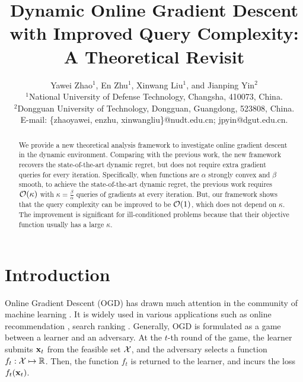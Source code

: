 \documentclass{article}
\date{}
\begin{document}
\title{Dynamic Online Gradient Descent with Improved Query Complexity: A Theoretical Revisit}

\author{Yawei Zhao$^1$, En Zhu$^1$, Xinwang Liu$^1$, and Jianping Yin$^2$ \\ 
$^1$National University of Defense Technology, Changsha, 410073, China. \\ 
$^2$Dongguan University of Technology, Dongguan, Guangdong, 523808, China. \\ 
E-mail: \{zhaoyawei, enzhu, xinwangliu\}@nudt.edu.cn; jpyin@dgut.edu.cn.
}

\maketitle



\begin{abstract}
We provide a new theoretical analysis framework to investigate online gradient descent in the dynamic environment. Comparing with the previous work, the new framework recovers the state-of-the-art dynamic regret, but does not require extra gradient queries for every iteration. Specifically, when functions are $\alpha$ strongly convex and $\beta$ smooth, to achieve the state-of-the-art dynamic regret, the previous work requires  ${\mathcal{O}}(\kappa)$ with $\kappa = \frac{\beta}{\alpha}$ queries of gradients at every iteration. But, our framework shows that the query complexity can be improved to be ${\mathcal{O}}(1)$, which does not depend on $\kappa$. The improvement is significant for ill-conditioned problems because that their objective function usually has a large $\kappa$.   

\end{abstract}








\section{Introduction}
Online Gradient Descent (OGD) has drawn much attention in the  community of machine learning \cite{Zhu:2015tr,Hazan2007Adaptive,Hall:2015ct,ShalevShwartz:2012dz,Garber:2018wf,Bedi:2018te}. It is widely used in various applications such as online recommendation \cite{Song:2008:RAT}, search ranking \cite{Moon:2010}. Generally, OGD is formulated as a game between a learner and an adversary. At the $t$-th round of the game, the learner submits ${\bf x}_t$ from the feasible set ${\mathcal{X}}$, and the adversary selects a function $f_t:{\mathcal{X}} \mapsto \mathbb{R}$. Then, the function $f_t$ is returned to the learner, and incurs the loss $f_t({\bf x}_t)$. 
\end{document}

